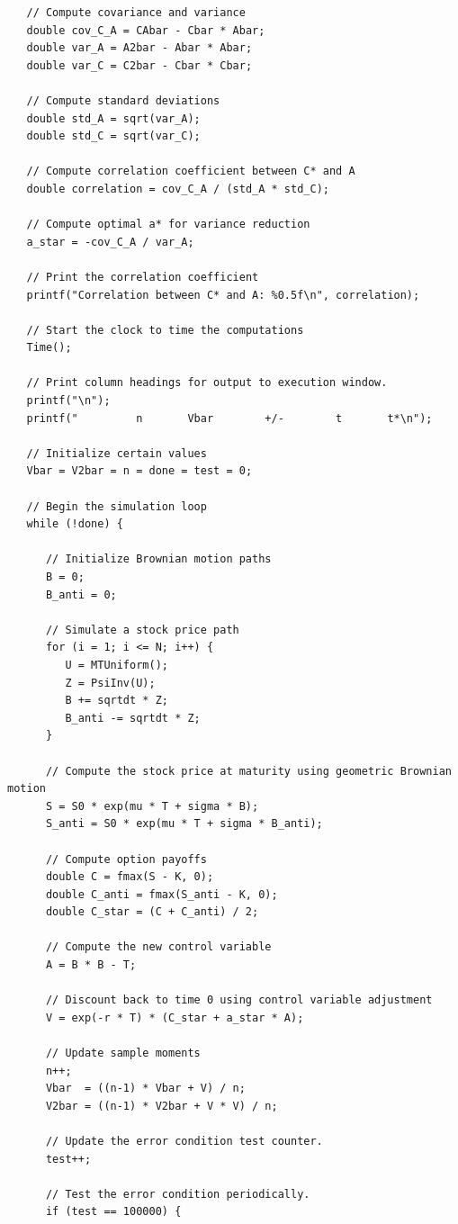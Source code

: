 \documentclass{report}
\begin{document}
\begin{lstlisting}
   // Compute covariance and variance
   double cov_C_A = CAbar - Cbar * Abar;
   double var_A = A2bar - Abar * Abar;
   double var_C = C2bar - Cbar * Cbar;

   // Compute standard deviations
   double std_A = sqrt(var_A);
   double std_C = sqrt(var_C);

   // Compute correlation coefficient between C* and A
   double correlation = cov_C_A / (std_A * std_C);

   // Compute optimal a* for variance reduction
   a_star = -cov_C_A / var_A;

   // Print the correlation coefficient
   printf("Correlation between C* and A: %0.5f\n", correlation);

   // Start the clock to time the computations
   Time();

   // Print column headings for output to execution window.
   printf("\n");
   printf("         n       Vbar        +/-        t       t*\n");

   // Initialize certain values
   Vbar = V2bar = n = done = test = 0;
   
   // Begin the simulation loop
   while (!done) {

      // Initialize Brownian motion paths
      B = 0;
      B_anti = 0;

      // Simulate a stock price path
      for (i = 1; i <= N; i++) {
         U = MTUniform();
         Z = PsiInv(U);
         B += sqrtdt * Z;
         B_anti -= sqrtdt * Z;
      }

      // Compute the stock price at maturity using geometric Brownian motion
      S = S0 * exp(mu * T + sigma * B);
      S_anti = S0 * exp(mu * T + sigma * B_anti);

      // Compute option payoffs
      double C = fmax(S - K, 0);
      double C_anti = fmax(S_anti - K, 0);
      double C_star = (C + C_anti) / 2;

      // Compute the new control variable
      A = B * B - T;

      // Discount back to time 0 using control variable adjustment
      V = exp(-r * T) * (C_star + a_star * A);

      // Update sample moments
      n++;
      Vbar  = ((n-1) * Vbar + V) / n;
      V2bar = ((n-1) * V2bar + V * V) / n;

      // Update the error condition test counter.
      test++;

      // Test the error condition periodically.
      if (test == 100000) {


\end{lstlisting}
\end{document}
